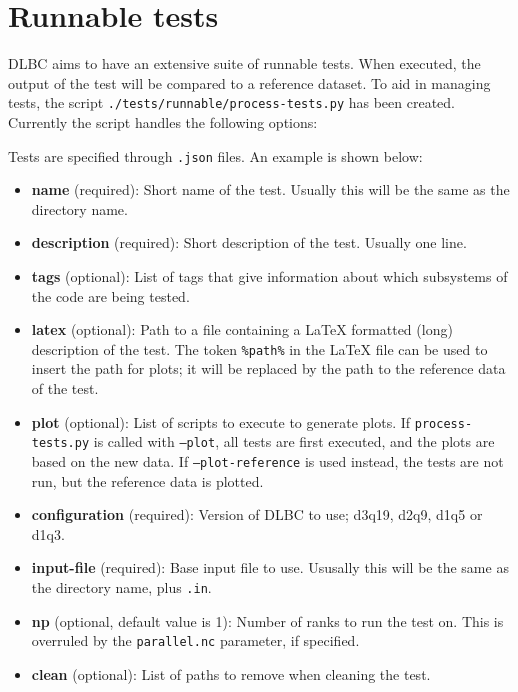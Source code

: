 \documentclass{article}
\begin{document}
\section{Runnable tests}

DLBC aims to have an extensive suite of runnable tests. When executed, the output of the test will be compared to a reference dataset.
To aid in managing tests, the script \texttt{./tests/runnable/process-tests.py} has been created.
Currently the script handles the following options:



\noindent
Tests are specified through \texttt{.json} files. An example is shown below:



\begin{itemize}
\item \textbf{name} (required): Short name of the test. Usually this will be the same as the directory name.
\item \textbf{description} (required): Short description of the test. Usually one line.
\item \textbf{tags} (optional): List of tags that give information about which subsystems of the code are being tested.
\item \textbf{latex} (optional): Path to a file containing a LaTeX formatted (long) description of the test. The token \texttt{\%path\%} in the LaTeX file can be used to insert the path for plots; it will be replaced by the path to the reference data of the test.
\item \textbf{plot} (optional): List of scripts to execute to generate plots. If \texttt{process-tests.py} is called with \texttt{--plot}, all tests are first executed, and the plots are based on the new data. If \texttt{--plot-reference} is used instead, the tests are not run, but the reference data is plotted.
\item \textbf{configuration} (required): Version of DLBC to use; d3q19, d2q9, d1q5 or d1q3.
\item \textbf{input-file} (required): Base input file to use. Ususally this will be the same as the directory name, plus \texttt{.in}.
\item \textbf{np} (optional, default value is 1): Number of ranks to run the test on. This is overruled by the \texttt{parallel.nc} parameter, if specified.
\item \textbf{clean} (optional): List of paths to remove when cleaning the test.

\end{itemize}
\end{document}
